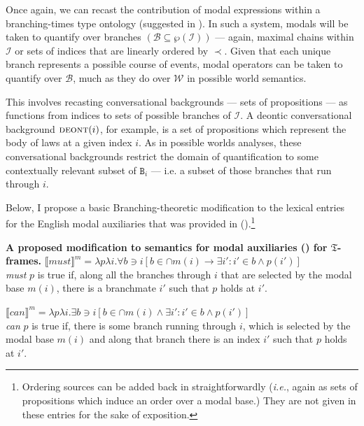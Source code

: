 \documentclass[11pt,dvipsnames]{report}
\providecommand{\denote}[2][]{\ensuremath{\llbracket{#2}\rrbracket^{#1}}}
\begin{document}
Once again, we can recast the contribution of modal expressions within a branching-times type ontology (suggested in \citealp[594, note 9]{VonPrince2019}). In such a system, modals will be taken to quantify over branches $ (\mathcal{B\subseteq\wp(I)})$ --- again, maximal chains within $ \mathcal I $ or sets of indices that are linearly ordered by $ \prec $. Given that each unique branch represents a possible course of events, modal operators can be taken to quantify over $ \mathcal B $, much as they do over $ \mathcal W $ in possible world semantics.

This involves recasting conversational backgrounds --- sets of propositions --- as functions from indices to sets of possible branches of $ \mathcal I $. A deontic conversational background $ \textsc{deont}(i) $, for example, is a set of propositions which represent the body of laws at a given index $ i $. As in possible worlds analyses, these conversational backgrounds restrict the domain of quantification to some contextually relevant subset of  $ \texttt{B}_i $ --- i.e. a subset of those branches that run through $ i $.

Below, I propose a basic Branching-theoretic modification to the  lexical entries for the English modal auxiliaries that was provided in ().\footnote{Ordering sources can be added back in straightforwardly (\textit{i.e.}, again as sets of propositions which induce an order over a modal base.) They are not given in these entries for the sake of exposition.}

\pex[exno=\getref{K-modals}′⁣] \textbf{A proposed modification to semantics for modal auxiliaries () for $ \mathfrak T $-frames.}
\a$ \denote[m]{\textit{must}}=\lambda p\lambda i.\forall b\ni i[b\in\cap m(i)\to \exists i':i'\in b\wedge p(i')] $\\
\textit{must} $ p $ is true if, along all the branches through $ i $ that are selected by the modal base $ m(i) $, there is a branchmate $ i' $ such that $ p $ holds at $ i' $.

\a$ \denote[m]{\textit{can}}=\lambda p\lambda i.\exists b\ni i[b\in\cap m(i)\wedge \exists i':i'\in b\wedge p(i')] $\\
\textit{ can } $ p $ is true if, there is some branch running through $ i $, which is selected by the modal base $ m(i) $ and along that branch there is an index $ i' $ such that $ p $ holds at $ i' $.
\end{document}
